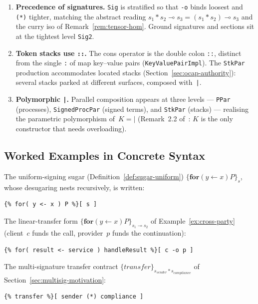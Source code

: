\documentclass[11pt,a4paper]{article}
\newcommand{\Par}{\mathbin{|}}
\newcommand{\forc}{\mathbf{for}}
\newcommand{\recv}[3]{\forc\!\left( #1 \leftarrow #2 \right) #3}
\newcommand{\signed}[2]{\{#1\}_{#2}}
\newcommand{\comp}{\mathbin{*}}
\begin{document}
\begin{enumerate}[nosep]
  \item \textbf{Precedence of signatures.}  \texttt{Sig} is
    stratified so that \verb|-o| binds loosest and \verb|(*)|
    tighter, matching the abstract reading
    $s_1 \comp s_2 \multimap s_3 = (s_1 \comp s_2) \multimap s_3$
    and the curry iso of Remark~\ref{rem:tensor-hom}.  Ground
    signatures and sections sit at the tightest level
    \texttt{Sig2}.
  \item \textbf{Token stacks use \texttt{::}.}  The cons
    operator is the double colon \verb|::|, distinct from the
    single \verb|:| of map key--value pairs
    (\texttt{KeyValuePairImpl}).  The \texttt{StkPar}
    production accommodates located stacks
    (Section~\ref{sec:ocap-authority}): several stacks parked
    at different surfaces, composed with~\verb"|".
  \item \textbf{Polymorphic \texttt{|}.}  Parallel composition
    appears at three levels --- \texttt{PPar} (processes),
    \texttt{SignedProcPar} (signed terms), and \texttt{StkPar}
    (stacks) --- realising the parametric polymorphism
    of~$K = \Par$ (Remark~2.2 of~\cite{CostEndofunctor}: $K$ is
    the only constructor that needs overloading).
\end{enumerate}

\subsection{Worked Examples in Concrete Syntax}
\label{app:concrete-examples}

The uniform-signing sugar (Definition~\ref{def:sugar-uniform})
$\signed{\recv{y}{x}{P}}{s}$, whose desugaring nests
recursively, is written:
\begin{lstlisting}[style=rholang]
{% for( y <- x ) P %}[ s ]
\end{lstlisting}

\noindent
The linear-transfer form
$\signed{\recv{y}{x}{P}}{s_1 \multimap s_2}$ of
Example~\ref{ex:cross-party} (client~$c$ funds the call,
provider~$p$ funds the continuation):
\begin{lstlisting}[style=rholang]
{% for( result <- service ) handleResult %}[ c -o p ]
\end{lstlisting}

\noindent
The multi-signature transfer contract
$\signed{\mathit{transfer}}{s_{\mathit{sender}} \comp
s_{\mathit{compliance}}}$ of
Section~\ref{sec:multisig-motivation}:
\begin{lstlisting}[style=rholang]
{% transfer %}[ sender (*) compliance ]
\end{lstlisting}
\end{document}
